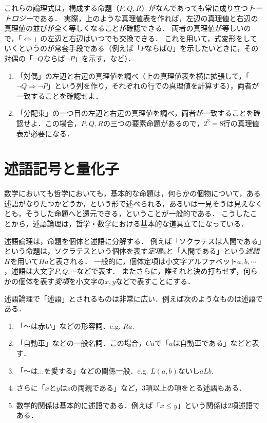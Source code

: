 \documentclass[11pt,a4paper]{jsarticle}
\begin{document}
これらの論理式は，構成する命題（$P, Q, R$）がなんであっても常に成り立つ\emph{トートロジー}である．
実際，上のような真理値表を作れば，左辺の真理値と右辺の真理値の並びが全く等しくなることが確認できる．
両者の真理値が等しいので，「$\iff$」の左辺と右辺はいつでも交換できる．
これを用いて，式変形をしていくというのが常套手段である（例えば「$P$ならば$Q$」を示したいときに，その対偶の「$\neg Q$ならば$\neg P$」を示す，など）．


\begin{exercise} 
 \begin{enumerate}
     \item 「対偶」の左辺と右辺の真理値を調べ（上の真理値表を横に拡張して，「$\neg Q \Rightarrow \neg P$」という列を作り，それぞれの行での真理値を計算する），両者が一致することを確認せよ．
     \item 「分配束」の一つ目の左辺と右辺の真理値を調べ，両者が一致することを確認せよ．この場合，$P, Q, R$の三つの要素命題があるので，$2^3=8$行の真理値表が必要になる．
 \end{enumerate}
\end{exercise}

\section{述語記号と量化子}
数学においても哲学においても，基本的な命題は，何らかの個物について，ある述語がなりたつかどうか，という形で述べられる，あるいは一見そうは見えなくとも，そうした命題へと還元できる，ということが一般的である．
こうしたことから，述語論理は，哲学・数学における基本的な道具立てになっている．

述語論理は，命題を個体と述語に分解する．
例えば「ソクラテスは人間である」という命題は，ソクラテスという個体を表す\emph{定項}$a$と「人間である」という\emph{述語}$H$を用いて$Ha$と表される．
一般的に，個体定項は小文字アルファベット$a, b, \cdots$，述語は大文字$P, Q, \cdots$などで表す．
またさらに，誰それと決め打ちせず，何らかの個体を表す\emph{変項}を小文字の$x, y$などで表すことにする． 

述語論理で「述語」とされるものは非常に広い．例えば次のようなものは述語である．
\begin{enumerate}
    \item 「〜は赤い」などの形容詞．e.g. $Ra$.
    \item 「自動車」などの一般名詞．この場合，$Ca$で「$a$は自動車である」などと表す．
    \item 「〜は...を愛する」などの関係一般．e.g. $L(a,b)$ないし$aLb$. 
    \item さらに「$x$と$y$は$z$の両親である」など，3項以上の項をとる述語もある．
    \item 数学的関係は基本的に述語である．例えば「$x \leq y$」という関係は2項述語である．
\end{enumerate}
\end{document}
